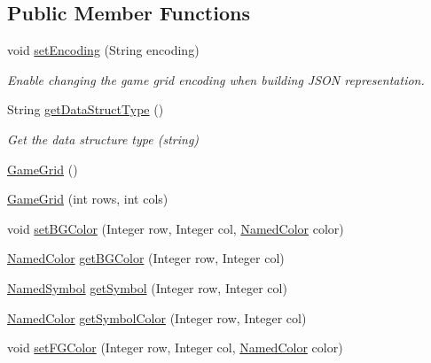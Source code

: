 \subsection*{Public Member Functions}
\begin{DoxyCompactItemize}
\item 
void \hyperlink{classbridges_1_1base_1_1_game_grid_a2281cfd7d61dc9903c9b1358c9767a1e}{set\+Encoding} (String encoding)
\begin{DoxyCompactList}\small\item\em Enable changing the game grid encoding when building J\+S\+ON representation. \end{DoxyCompactList}\item 
String \hyperlink{classbridges_1_1base_1_1_game_grid_a4d88979ac0f74f212392c5efe1400916}{get\+Data\+Struct\+Type} ()
\begin{DoxyCompactList}\small\item\em Get the data structure type (string) \end{DoxyCompactList}\item 
\hyperlink{classbridges_1_1base_1_1_game_grid_a0b5330e66b504eddc00617c5f1fa6240}{Game\+Grid} ()
\item 
\hyperlink{classbridges_1_1base_1_1_game_grid_acfe6d52979dae94b1d883fed4965feb3}{Game\+Grid} (int rows, int cols)
\item 
void \hyperlink{classbridges_1_1base_1_1_game_grid_a72d7d5b03b78fdc4110cee955727a523}{set\+B\+G\+Color} (Integer row, Integer col, \hyperlink{enumbridges_1_1base_1_1_named_color}{Named\+Color} color)
\item 
\hyperlink{enumbridges_1_1base_1_1_named_color}{Named\+Color} \hyperlink{classbridges_1_1base_1_1_game_grid_abf8435b464054c1f290985b05ce7cd97}{get\+B\+G\+Color} (Integer row, Integer col)
\item 
\hyperlink{enumbridges_1_1base_1_1_named_symbol}{Named\+Symbol} \hyperlink{classbridges_1_1base_1_1_game_grid_a974e33d5561a8f214966be626a9ca8ca}{get\+Symbol} (Integer row, Integer col)
\item 
\hyperlink{enumbridges_1_1base_1_1_named_color}{Named\+Color} \hyperlink{classbridges_1_1base_1_1_game_grid_ab094ebfd585aac9440836ad6875ce094}{get\+Symbol\+Color} (Integer row, Integer col)
\item 
void \hyperlink{classbridges_1_1base_1_1_game_grid_a105b46f68bcc9413889e7255318bab4c}{set\+F\+G\+Color} (Integer row, Integer col, \hyperlink{enumbridges_1_1base_1_1_named_color}{Named\+Color} color)
\item 

\end{DoxyCompactItemize}
